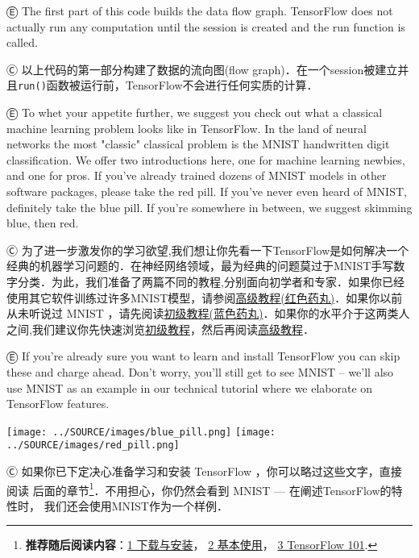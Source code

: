 Ⓔ \textcolor{etc}{The first part of this code builds the data flow graph. TensorFlow does not actually run any computation until the session is created and the run function is called.}

Ⓒ 以上代码的第一部分构建了数据的流向图(flow graph)．在一个session被建立并且\lstinline{run()}函数被运行前，TensorFlow不会进行任何实质的计算．

Ⓔ \textcolor{etc}{To whet your appetite further, we suggest you check out what a classical machine learning problem looks like in TensorFlow. In the land of neural networks the most "classic" classical problem is the MNIST handwritten digit classification. We offer two introductions here, one for machine learning newbies, and one for pros. If you've already trained dozens of MNIST models in other software packages, please take the red pill. If you've never even heard of MNIST, definitely take the blue pill. If you're somewhere in between, we suggest skimming blue, then red.}

Ⓒ 为了进一步激发你的学习欲望,我们想让你先看一下TensorFlow是如何解决一个经典的机器学习问题的．在神经网络领域，最为经典的问题莫过于MNIST手写数字分类．为此，我们准备了两篇不同的教程,分别面向初学者和专家．如果你已经使用其它软件训练过许多MNIST模型，请参阅\hyperref[MINIST_pros]{高级教程(红色药丸)}．如果你以前从未听说过 MNIST ，请先阅读\hyperref[MINIST_beginner]{初级教程(蓝色药丸)}．如果你的水平介于这两类人之间,我们建议你先快速浏览\hyperref[MINIST_beginner]{初级教程}，然后再阅读\hyperref[MINIST_pros]{高级教程}．


Ⓔ \textcolor{etc}{If you're already sure you want to learn and install TensorFlow you can skip these and charge ahead. Don't worry, you'll still get to see MNIST -- we'll also use MNIST as an example in our technical tutorial where we elaborate on TensorFlow features.}

\begin{center}
\texttt{[image: ../SOURCE/images/blue\_pill.png]}
\texttt{[image: ../SOURCE/images/red\_pill.png]}
\end{center}

Ⓒ 如果你已下定决心准备学习和安装 TensorFlow ，你可以略过这些文字，直接阅读
后面的章节\footnote{\textbf{推荐随后阅读内容}：\hyperref[download_install]{1 下载与安装}， \hyperref[basic_usage]{2 基本使用}， \hyperref[tf_mech101]{3 TensorFlow 101}.}．不用担心，你仍然会看到 MNIST --- 在阐述TensorFlow的特性时，
我们还会使用MNIST作为一个样例．
